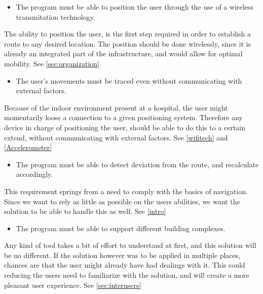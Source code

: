 \begin{itemize}
	\item The program must be able to position the user through the use of a wireless transmitation technology.
\end{itemize}
The ability to position the user, is the first step required in order to establish a route to any desired location. The position should be done wirelessly, since it is already an integrated part of the infrastructure, and would allow for optimal mobility. See \cref{sec:organization}

\begin{itemize}
	\item The user's movements must be traced even without communicating with external factors.
\end{itemize}
Because of the indoor environment present at a hospital, the user might momentarily loose a connection to a given positioning system. Therefore any device in charge of positioning the user, should be able to do this to a certain extend, without communicating with external factors. See \cref{wifitech} and \cref{Accelerometer}

\begin{itemize}
	\item The program must be able to detect deviation from the route, and recalculate accordingly.
\end{itemize}
This requirement springs from a need to comply with the basics of navigation. Since we want to rely as little as possible on the users abilities, we want the solution to be able to handle this as well. See \cref{intro}

\begin{itemize}
	\item The program must be able to support different building complexes.
\end{itemize}
Any kind of tool takes a bit of effort to understand at first, and this solution will be no different. If the solution however was to be applied in multiple places, chances are that the user might already have had dealings with it. This could reducing the users need to familiarize with the solution, and will create a more pleasant user experience. See \cref{sec:interusers}

